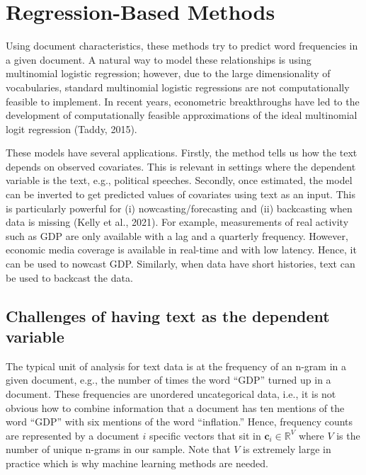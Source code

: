 \documentclass[
]{book}
\begin{document}
\hypertarget{regression-based-methods}{%
\chapter{Regression-Based Methods}\label{regression-based-methods}}

Using document characteristics, these methods try to predict word frequencies in a given document. A natural way to model these relationships is using multinomial logistic regression; however, due to the large dimensionality of vocabularies, standard multinomial logistic regressions are not computationally feasible to implement. In recent years, econometric breakthroughs have led to the development of computationally feasible approximations of the ideal multinomial logit regression (Taddy, 2015).

These models have several applications. Firstly, the method tells us how the text depends on observed covariates. This is relevant in settings where the dependent variable is the text, e.g., political speeches. Secondly, once estimated, the model can be inverted to get predicted values of covariates using text as an input. This is particularly powerful for (i) nowcasting/forecasting and (ii) backcasting when data is missing (Kelly et al., 2021). For example, measurements of real activity such as GDP are only available with a lag and a quarterly frequency. However, economic media coverage is available in real-time and with low latency. Hence, it can be used to nowcast GDP. Similarly, when data have short histories, text can be used to backcast the data.

\hypertarget{challenges-of-having-text-as-the-dependent-variable}{%
\section{Challenges of having text as the dependent variable}\label{challenges-of-having-text-as-the-dependent-variable}}

The typical unit of analysis for text data is at the frequency of an n-gram in a given document, e.g., the number of times the word ``GDP'' turned up in a document. These frequencies are unordered uncategorical data, i.e., it is not obvious how to combine information that a document has ten mentions of the word ``GDP'' with six mentions of the word ``inflation.'' Hence, frequency counts are represented by a document \(i\) specific vectors that sit in \(\mathbf{c}_{i}\in\mathbb{R}^V\) where \(V\) is the number of unique n-grams in our sample. Note that \(V\) is extremely large in practice which is why machine learning methods are needed.
\end{document}
